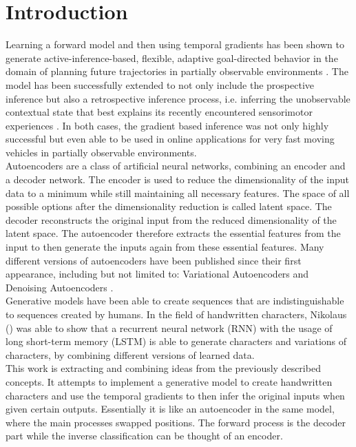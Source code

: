 
\chapter{Introduction}
\label{chap:Introduction}

Learning a forward model and then using temporal gradients has been shown to generate active-inference-based, flexible, adaptive goal-directed behavior in the domain of planning future trajectories in partially observable environments \cite{RocketballOtte2017}. The model has been successfully extended to not only include the prospective inference but also a retrospective inference process, i.e. inferring the unobservable contextual state that best explains its recently encountered sensorimotor experiences \cite{REPRISE2018}. In both cases, the gradient based inference was not only highly successful but even able to be used in online applications for very fast moving vehicles in partially observable environments. \\
Autoencoders are a class of artificial neural networks, combining an encoder and a decoder network. The encoder is used to reduce the dimensionality of the input data to a minimum while still maintaining all necessary features. The space of all possible options after the dimensionality reduction is called latent space. The decoder reconstructs the original input from the reduced dimensionality of the latent space. The autoencoder therefore extracts the essential features from the input to then generate the inputs again from these essential features. Many different versions of autoencoders have been published since their first appearance, including but not limited to: Variational Autoencoders \cite{2013VAE} and Denoising Autoencoders \cite{DenoisingAutoencodersVincent2010}. \\
Generative models have been able to create sequences that are indistinguishable to sequences created by humans. In the field of handwritten characters, Nikolaus (\cite{2018Nikolaus}) was able to show that a recurrent neural network (RNN) with the usage of long short-term memory (LSTM) is able to generate characters and variations of characters, by combining different versions of learned data. \\
This work is extracting and combining ideas from the previously described concepts. It attempts to implement a generative model to create handwritten characters and use the temporal gradients to then infer the original inputs when given certain outputs. Essentially it is like an autoencoder in the same model, where the main processes swapped positions. The forward process is the decoder part while the inverse classification can be thought of an encoder. \\
